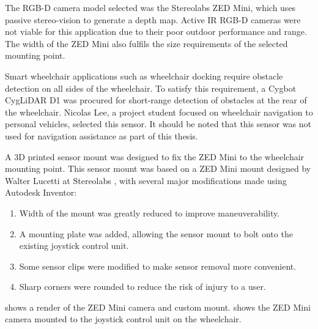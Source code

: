 The RGB-D camera model selected was the Stereolabs ZED Mini, which uses passive stereo-vision
to generate a depth map. Active IR RGB-D cameras were not viable for this application
due to their poor outdoor performance and range. The width of the ZED Mini also fulfils the
size requirements of the selected mounting point.

Smart wheelchair applications such as wheelchair docking require
obstacle detection on all sides of the wheelchair. To satisfy this requirement, a
Cygbot CygLiDAR D1 was procured for short-range detection of obstacles at the rear of the
wheelchair. Nicolas Lee, a project student focused on
wheelchair navigation to personal vehicles, selected this sensor. It should be noted that
this sensor was not used for navigation assistance as part of this thesis.

A 3D printed sensor mount was designed to fix the ZED Mini to the wheelchair mounting point.
This sensor mount was based on a ZED Mini mount designed by Walter Lucetti at Stereolabs \cite{lucettiStereolabsZEDMini2018},
with several major modifications made using Autodesk Inventor:
\begin{enumerate}[topsep=0pt,itemsep=-1ex,partopsep=1ex,parsep=1ex]
    \item Width of the mount was greatly reduced to improve maneuverability.
    \item A mounting plate was added, allowing the sensor mount to bolt onto
            the existing joystick control unit.
    \item Some sensor clips were modified to make sensor removal more convenient.
    \item Sharp corners were rounded to reduce the risk of injury to a user.
\end{enumerate}
 shows a render of the ZED Mini camera and custom mount.
 shows the ZED Mini camera mounted to the joystick control unit
on the wheelchair.

